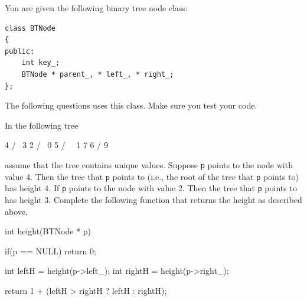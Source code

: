 

You are given the following binary tree node class:
\begin{Verbatim}[frame=single,fontsize=\footnotesize]
class BTNode
{
public:
    int key_;
    BTNode * parent_, * left_, * right_;
};
\end{Verbatim}
The following questions uses this class.
Make sure you test your code.

\nextq
In the following tree
\begin{console}[fontsize=\footnotesize]
        4
       / \
      3   2
         / \
        0   5
       / \   \
      1   7   6
         /
        9
\end{console}
assume that the tree contains unique values.
Suppose \verb!p! points to the node with value 4.
Then the tree that \verb!p! points to (i.e., the root of the tree
that \verb!p! points to) has height 4.
If \verb!p! points to the node with value 2.
Then the tree that \verb!p! points to has height 3.
Complete the following function that returns the height
as described above.
\\
\ANSWER
\begin{answercode}
int height(BTNode * p)
{
  if(p == NULL)
      return 0;

  int leftH = height(p->left_);
  int rightH = height(p->right_);

  return 1 + (leftH > rightH ? leftH : rightH);
}
\end{answercode}

